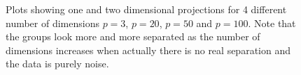 \documentclass[12]{article}
\begin{document}
\begin{figure}[hbtp]
       \caption{Plots showing one and two dimensional projections for 4 different number of dimensions $p=3$, $p=20$, $p=50$ and $p=100$. Note that the groups look more and more separated as the number of dimensions increases when actually there is no real separation and the data is purely noise.  }
       \label{dist_1d}
\end{figure}
\end{document}
